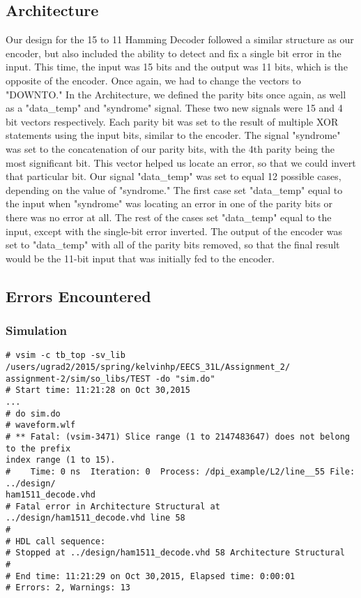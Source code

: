 \documentclass[paper=letter, fontsize=11pt]{scrartcl}
\numberwithin{equation}{section} %
\numberwithin{figure}{section} %
\numberwithin{table}{section} %
\begin{document}
\subsection{Architecture}
\begin{flushleft}
	Our design for the 15 to 11 Hamming Decoder followed a similar structure as our encoder, but also included the ability to detect and fix a single bit error in the input. This time, the input was 15 bits and the output was 11 bits, which is the opposite of the encoder. Once again, we had to change the vectors to "DOWNTO." In the Architecture, we defined the parity bits once again, as well as a "data\_temp" and "syndrome" signal. These two new signals were 15 and 4 bit vectors respectively. Each parity bit was set to the result of multiple XOR statements using the input bits, similar to the encoder. The signal "syndrome" was set to the concatenation of our parity bits, with the 4th parity being the most significant bit. This vector helped us locate an error, so that we could invert that particular bit. Our signal "data\_temp" was set to equal 12 possible cases, depending on the value of "syndrome." The first case set "data\_temp" equal to the input when "syndrome" was locating an error in one of the parity bits or there was no error at all. The rest of the cases set "data\_temp" equal to the input, except with the single-bit error inverted. The output of the encoder was set to "data\_temp" with all of the parity bits removed, so that the final result would be the 11-bit input that was initially fed to the encoder. \\[20pt]      
\end{flushleft}

\subsection{Errors Encountered}

\subsubsection{Simulation}
\begin{verbatim}
# vsim -c tb_top -sv_lib /users/ugrad2/2015/spring/kelvinhp/EECS_31L/Assignment_2/
assignment-2/sim/so_libs/TEST -do "sim.do"
# Start time: 11:21:28 on Oct 30,2015
...
# do sim.do
# waveform.wlf
# ** Fatal: (vsim-3471) Slice range (1 to 2147483647) does not belong to the prefix 
index range (1 to 15).
#    Time: 0 ns  Iteration: 0  Process: /dpi_example/L2/line__55 File: ../design/
ham1511_decode.vhd
# Fatal error in Architecture Structural at ../design/ham1511_decode.vhd line 58
#
# HDL call sequence:
# Stopped at ../design/ham1511_decode.vhd 58 Architecture Structural
#
# End time: 11:21:29 on Oct 30,2015, Elapsed time: 0:00:01
# Errors: 2, Warnings: 13
\end{verbatim} 
\end{document}
